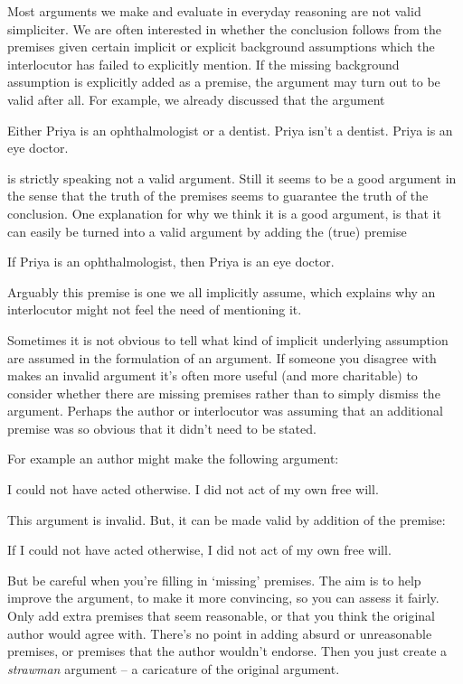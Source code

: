 Most arguments we make and evaluate in everyday reasoning are not valid simpliciter. We are often interested in whether the conclusion follows from the premises given certain implicit or explicit background assumptions which the interlocutor has failed to explicitly mention. If the missing background assumption is explicitly added as a premise, the argument may turn out to be valid after all. For example, we already discussed that the argument
\begin{earg}
	\prem Either Priya is an ophthalmologist or a dentist.
	\prem Priya isn't a dentist.
	\conc Priya is an eye doctor.
\end{earg}
is strictly speaking not a valid argument. Still it seems to be a good argument in the sense that the truth of the premises seems to guarantee the truth of the conclusion. One explanation for why we think it is a good argument, is that it can easily be turned into a valid argument by adding the (true) premise
\begin{earg}
\prem If Priya is an ophthalmologist, then Priya is an eye doctor.
\end{earg}
Arguably this premise is one we all implicitly assume, which explains why an interlocutor might not feel the need of mentioning it.

Sometimes it is not obvious to tell what kind of implicit underlying assumption are assumed in the formulation of an argument. If someone you disagree with makes an invalid
argument it’s often more useful (and more charitable) to consider
whether there are missing premises rather than to simply dismiss the argument. Perhaps the author or interlocutor was assuming that an additional
premise was so obvious that it didn’t need to be stated.

For example an author might make the following argument:
\begin{earg}
\prem I could not have acted otherwise.
\conc I did not act of my own free will.
\end{earg}
This argument is invalid. But, it can be made valid by addition of the premise:
\begin{earg}
\prem If I could not have acted otherwise, I did not act of my own free will.
\end{earg}

But be careful when you’re filling in ‘missing’ premises.
The aim is to help improve the argument, to make it
more convincing, so you can assess it fairly.
Only add extra premises that seem reasonable, or that you think
the original author would agree with.
There’s no point in adding absurd or unreasonable
premises, or premises that the author wouldn’t
endorse. Then you just create a \emph{strawman} argument –
a caricature of the original argument.


